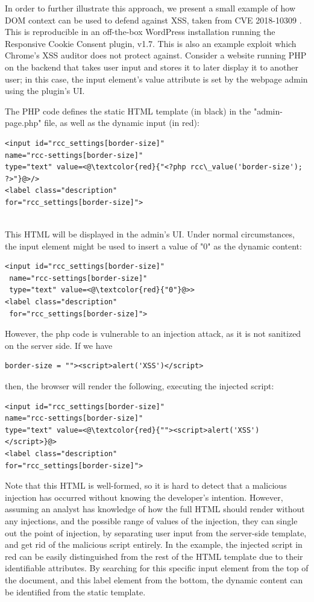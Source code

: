 In order to further illustrate this approach, we present a small example of how DOM context can be used to defend against XSS, taken from CVE 2018-10309 \cite{examplecve}. This is reproducible in an off-the-box WordPress installation running the Responsive Cookie Consent plugin, v1.7. This is also an example exploit which Chrome's XSS auditor does not protect against. Consider a website running PHP on the backend that takes user input and stores it to later display it to another user; in this case, the input element's value attribute is set by the webpage admin using the plugin's UI.

The PHP code defines the static HTML template (in black) in the "admin-page.php" file, as well as the dynamic input (in red):

\begin{lstlisting}
<input id="rcc_settings[border-size]" 
name="rcc-settings[border-size]" 
type="text" value=<@\textcolor{red}{"<?php rcc\_value('border-size'); ?>"}@>/>
<label class="description"
for="rcc_settings[border-size]">
\end{lstlisting}
\
\\
This HTML will be displayed in the admin's UI. Under normal circumstances, the input element might be used to insert a value of "0" as the dynamic content:
\\
\begin{lstlisting}
<input id="rcc_settings[border-size]" 
 name="rcc-settings[border-size]" 
 type="text" value=<@\textcolor{red}{"0"}@>>
<label class="description"
 for="rcc_settings[border-size]">
\end{lstlisting}
However, the php code is vulnerable to an injection attack, as it is not sanitized on the server side. If we have
\begin{lstlisting}
border-size = ""><script>alert('XSS')</script>
\end{lstlisting}
then, the browser will render the following, executing the injected script:
\begin{lstlisting}
<input id="rcc_settings[border-size]" 
name="rcc-settings[border-size]" 
type="text" value=<@\textcolor{red}{""><script>alert('XSS')</script>}@>
<label class="description"
for="rcc_settings[border-size]">
\end{lstlisting}

Note that this HTML is well-formed, so it is hard to detect that a malicious injection has occurred without knowing the developer's intention. However, assuming an analyst has knowledge of how the full HTML should render without any injections, and the possible range of values of the injection, they can single out the point of injection, by separating user input from the server-side template, and get rid of the malicious script entirely. In the example, the injected script in red can be easily distinguished from the rest of the HTML template due to their identifiable attributes. By searching for this specific input element from the top of the document, and this label element from the bottom, the dynamic content can be identified from the static template.

